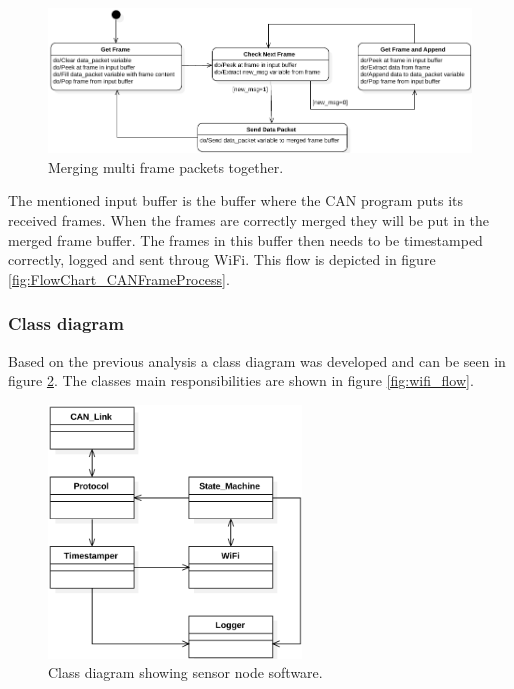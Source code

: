 \begin{figure}[!h]
\centering
\includegraphics[width=1\textwidth]{graphics/StateDiagram_ConcatMsgProcess}
\caption{Merging multi frame packets together.}
\label{fig:StateDiagram_ConcatMsgProcess}
\end{figure}

The mentioned input buffer is the buffer where the CAN program puts its received frames. 
When the frames are correctly merged they will be put in the merged frame buffer.
The frames in this buffer then needs to be timestamped correctly, logged and sent throug WiFi.
This flow is depicted in figure \ref{fig:FlowChart_CANFrameProcess}.


\subsubsection*{Class diagram}
Based on the previous analysis a class diagram was developed and can be seen in figure \ref{fig:StateDiagram_NodeWiFi}.
The classes main responsibilities are shown in figure \ref{fig:wifi_flow}.

\begin{figure}[!h]
\centering
\includegraphics[width=0.6\textwidth]{graphics/ClassDiagram_NodeWiFi}
\caption{Class diagram showing sensor node software.}
\label{fig:StateDiagram_NodeWiFi}
\end{figure}

